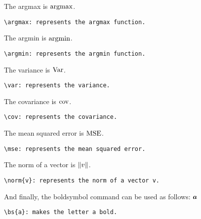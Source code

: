 \documentclass{article}
\begin{document}
The argmax is $\operatorname*{argmax}$.
\begin{verbatim}
\argmax: represents the argmax function.
\end{verbatim}

The argmin is $\operatorname*{argmin}$.
\begin{verbatim}
\argmin: represents the argmin function.
\end{verbatim}

The variance is $\operatorname{{\mathrm{Var}}}$.
\begin{verbatim}
\var: represents the variance.
\end{verbatim}

The covariance is $\operatorname{{\mathrm{cov}}}$.
\begin{verbatim}
\cov: represents the covariance.
\end{verbatim}

The mean squared error is $\operatorname{{\mathrm{MSE}}}$.
\begin{verbatim}
\mse: represents the mean squared error.
\end{verbatim}

The norm of a vector is $\left\lVert v\right\rVert$.
\begin{verbatim}
\norm{v}: represents the norm of a vector v.
\end{verbatim}

And finally, the boldsymbol command can be used as follows: $\boldsymbol{a}$
\begin{verbatim}
\bs{a}: makes the letter a bold.
\end{verbatim}
\end{document}

